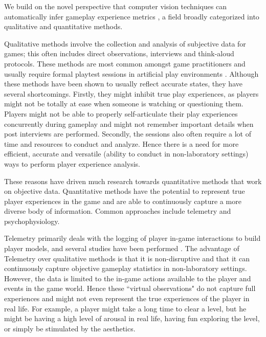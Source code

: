 \documentclass[letterpaper]{article}
\begin{document}
We build on the novel perspective that computer vision techniques can automatically infer gameplay experience metrics \cite{Tan2012,tan2012feasibility}, a field broadly categorized into qualitative and quantitative methods.

Qualitative methods involve the collection and analysis of subjective data for games; this often includes direct observations, interviews and think-aloud protocols. These methods are most common amongst game practitioners and usually require formal playtest sessions in artificial play environments \cite{tan2012feasibility}. Although these methods have been shown to usually reflect accurate states, they have several shortcomings. Firstly, they might inhibit true play experiences, as players might not be totally at ease when someone is watching or questioning them. Players might not be able to properly self-articulate their play experiences concurrently during gameplay and might not remember important details when post interviews are performed. Secondly, the sessions also often require a lot of time and resources to conduct and analyze. Hence there is a need for more efficient, accurate and versatile (ability to conduct in non-laboratory settings) ways to perform player experience analysis.

These reasons have driven much research towards quantitative methods that work on objective data. Quantitative methods have the potential to represent true player experiences in the game and are able to continuously capture a more diverse body of information. Common approaches include telemetry and psychophysiology.

Telemetry primarily deals with the logging of player in-game interactions to build player models, and several studies have been performed \cite{Zammitto2010,Medler2011,Moura2011,Gagne2011}. The advantage of Telemetry over qualitative methods is that it is non-disruptive and that it can continuously capture objective gameplay statistics in non-laboratory settings. However, the data is limited to the in-game actions available to the player and events in the game world. Hence these ``virtual observations" do not capture full experiences and might not even represent the true experiences of the player in real life. For example, a player might take a long time to clear a level, but he might be having a high level of arousal in real life, having fun exploring the level, or simply be stimulated by the aesthetics.
\end{document}
